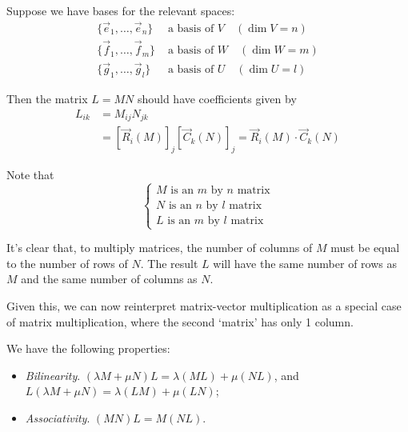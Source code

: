 \documentclass{../template/note}
\begin{document}

    Suppose we have bases for the relevant spaces:
    \begin{align*}
        \{\vec e_1, \dots, \vec e_n\} &\text{ a basis of } V \quad (\dim V = n)\\
        \{\vec f_1, \dots, \vec f_m\} &\text{ a basis of } W \quad (\dim W = m)\\
        \{\vec g_1, \dots, \vec g_l\} &\text{ a basis of } U \quad (\dim U = l)
    \end{align*}

    Then the matrix \(L = MN\) should have coefficients given by
    \begin{align*}
        L_{ik} &= M_{ij}N_{jk} \\
        &= [\vec R_i(M)]_j [\vec C_k(N)]_j = \vec R_i(M) \cdot \vec C_k(N)
    \end{align*}

    Note that
    \[
        \begin{cases}
            M \text{ is an } m \text{ by } n \text{ matrix} \\
            N \text{ is an } n \text{ by } l \text{ matrix} \\
            L \text{ is an } m \text{ by } l \text{ matrix}
        \end{cases}
    \]

    \begin{remark}
        It's clear that, to multiply matrices, the number of columns of \(M\) must be equal to the number of rows of \(N\). The result \(L\) will have the same number of rows as \(M\) and the same number of columns as \(N\).
    \end{remark}
    
    \begin{remark}
        Given this, we can now reinterpret matrix-vector multiplication as a special case of matrix multiplication, where the second `matrix' has only 1 column.
    \end{remark}
    
    We have the following properties:

    \begin{itemize}
        \item \emph{Bilinearity}. \((\lambda M + \mu N)L = \lambda(ML) + \mu(NL)\), and \(L(\lambda M + \mu N) = \lambda(LM) + \mu(LN)\);
        \item \emph{Associativity}. \((MN)L = M(NL)\).
    \end{itemize}
    
\end{document}
